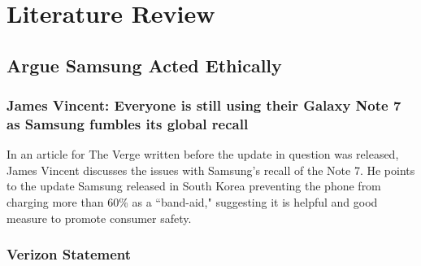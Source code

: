 \documentclass[12pt]{article}
\begin{document}
   

\section{Literature Review}

   \subsection{Argue Samsung Acted Ethically}
   
   \subsubsection{James Vincent: Everyone is still using their Galaxy Note 7 as Samsung fumbles its global recall}
   
      In an article for The Verge written before the update in question was released, James Vincent discusses the issues with Samsung's recall of the Note 7.\cite{jamesVincentVerge} He points to the update Samsung released in South Korea preventing the phone from charging more than 60\% as a ``band-aid," suggesting it is helpful and good measure to promote consumer safety\cite{jamesVincentVerge}. 
   
   \subsubsection{Verizon Statement}
   
\end{document}

